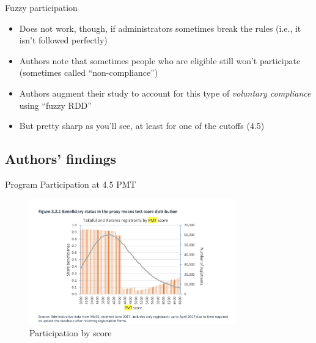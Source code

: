 \documentclass{beamer}
\begin{document}
\begin{frame}{Fuzzy participation}

\begin{itemize}
\item Does not work, though, if administrators sometimes break the rules (i.e., it isn't followed perfectly)
\item Authors note that sometimes people who are eligible still won't participate (sometimes called ``non-compliance'')
\item Authors augment their study to account for this type of \emph{voluntary compliance} using ``fuzzy RDD'' 
\item But pretty sharp as you'll see, at least for one of the cutoffs (4.5)
\end{itemize}

\end{frame}

\subsection{Authors' findings}

\begin{frame}{Program Participation at 4.5 PMT}
    \begin{figure}
        \centering
        \includegraphics[width=0.8\textwidth]{./lecture_includes/takaful_density.png}
        \caption{Participation by score}
    \end{figure}
\end{frame}
\end{document}
